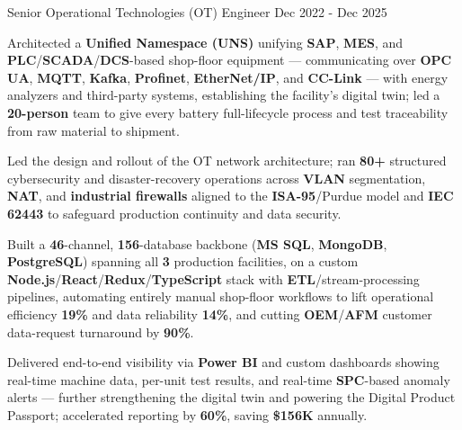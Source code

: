 \begin{cventries}
  \cventry
    {Senior Operational Technologies (OT) Engineer} %
    {} %
    {} %
    {Dec 2022 - Dec 2025} %
    {
      \begin{cvitems} %
        \item {Architected a \textbf{Unified Namespace (UNS)} unifying \textbf{SAP}, \textbf{MES}, and \textbf{PLC}/\textbf{SCADA}/\textbf{DCS}-based shop-floor equipment --- communicating over \textbf{OPC UA}, \textbf{MQTT}, \textbf{Kafka}, \textbf{Profinet}, \textbf{EtherNet/IP}, and \textbf{CC-Link} --- with energy analyzers and third-party systems, establishing the facility's digital twin; led a \textbf{20-person} team to give every battery full-lifecycle process and test traceability from raw material to shipment.}
        \item {Led the design and rollout of the OT network architecture; ran \textbf{80+} structured cybersecurity and disaster-recovery operations across \textbf{VLAN} segmentation, \textbf{NAT}, and \textbf{industrial firewalls} aligned to the \textbf{ISA-95}/Purdue model and \textbf{IEC 62443} to safeguard production continuity and data security.}
        \item {Built a \textbf{46}-channel, \textbf{156}-database backbone (\textbf{MS SQL}, \textbf{MongoDB}, \textbf{PostgreSQL}) spanning all \textbf{3} production facilities, on a custom \textbf{Node.js}/\textbf{React}/\textbf{Redux}/\textbf{TypeScript} stack with \textbf{ETL}/stream-processing pipelines, automating entirely manual shop-floor workflows to lift operational efficiency \textbf{19\%} and data reliability \textbf{14\%}, and cutting \textbf{OEM}/\textbf{AFM} customer data-request turnaround by \textbf{90\%}.}
        \item {Delivered end-to-end visibility via \textbf{Power BI} and custom dashboards showing real-time machine data, per-unit test results, and real-time \textbf{SPC}-based anomaly alerts --- further strengthening the digital twin and powering the Digital Product Passport; accelerated reporting by \textbf{60\%}, saving \textbf{\$156K} annually.}
      \end{cvitems}
    }

\end{cventries}

\vspace{-3mm}

